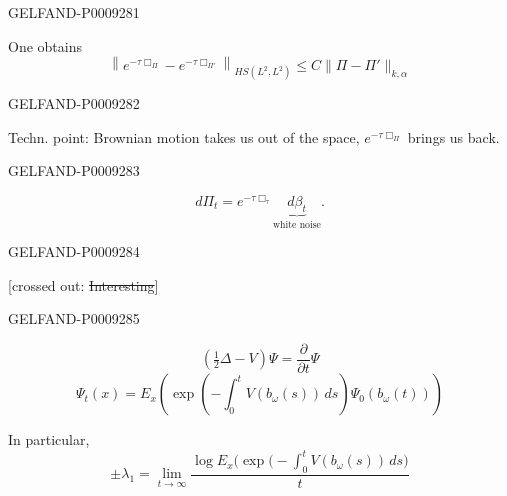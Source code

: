 \begin{GelfandAdjacentEvidence}{GELFAND-P000928}{1}

One obtains
\begin{equation*}
 \left\|e^{-\tau\Box_\Pi}-e^{-\tau\Box_{\Pi'}}\right\|_{HS(L^2,L^2)}
 \le C\|\Pi-\Pi'\|_{k,\alpha}
 \tag{8}
\end{equation*}
\end{GelfandAdjacentEvidence}
\begin{GelfandAdjacentEvidence}{GELFAND-P000928}{2}


Techn. point: Brownian motion takes us out of the space, $e^{-\tau\Box_\Pi}$ brings us back.
\end{GelfandAdjacentEvidence}
\begin{GelfandAdjacentEvidence}{GELFAND-P000928}{3}

\begin{equation*}
 d\Pi_t=e^{-\tau\Box_\tau}\underbrace{d\beta_t}_{\text{white noise}}.
 \tag{9}
\end{equation*}
\end{GelfandAdjacentEvidence}
\begin{GelfandAdjacentEvidence}{GELFAND-P000928}{4}


[crossed out: \sout{Interesting}]
\end{GelfandAdjacentEvidence}
\begin{GelfandAdjacentEvidence}{GELFAND-P000928}{5}

\begin{equation*}
 \left(\tfrac12\Delta-V\right)\Psi=\frac{\partial}{\partial t}\Psi
 \tag{10}
\end{equation*}
\begin{equation*}
 \Psi_t(x)=E_x\left(\exp\left(-\int_0^t V(b_\omega(s))\,ds\right)
 \Psi_0(b_\omega(t))\right)
 \tag{11}
\end{equation*}

In particular,
\begin{equation*}
 \pm\lambda_1=\lim_{t\to\infty}
 \frac{\log E_x\bigl(\exp\bigl(-\int_0^t V(b_\omega(s))\,ds\bigr)}{t}
 \tag{12}
\end{equation*}
\end{GelfandAdjacentEvidence}
